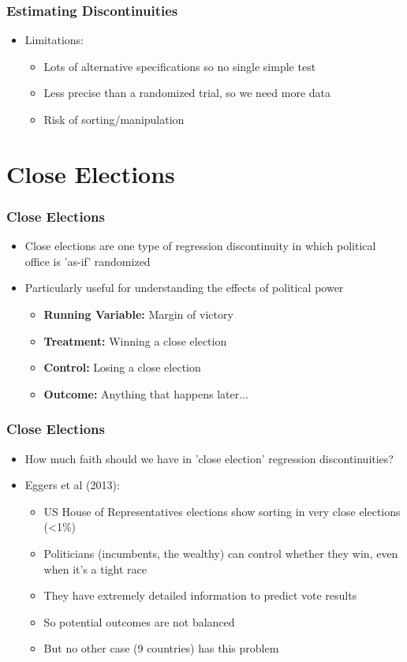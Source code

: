 \documentclass[xcolor=x11names,compress]{beamer}\usepackage[]{graphicx}\usepackage[]{color}
\renewcommand{\(}{\begin{columns}}
\renewcommand{\)}{\end{columns}}
\newcommand{\<}[1]{\begin{column}{#1}}
\renewcommand{\>}{\end{column}}
\begin{document}
\begin{frame}
\frametitle{Estimating Discontinuities}
\begin{itemize}
\item Limitations:
\begin{itemize}
\item Lots of alternative specifications so no single simple test
\pause
\item Less precise than a randomized trial, so we need more data
\pause
\item Risk of sorting/manipulation
\end{itemize}
\end{itemize}
\end{frame}

\section{Close Elections}

\begin{frame}
\frametitle{Close Elections}
\begin{itemize}
\item Close elections are one type of regression discontinuity in which political office is 'as-if' randomized
\pause
\item Particularly useful for understanding the effects of political power
\pause
\begin{itemize}
\item \textbf{Running Variable: }Margin of victory
\item \textbf{Treatment: }Winning a close election
\item \textbf{Control: }Losing a close election
\item \textbf{Outcome: }Anything that happens later...
\end{itemize}
\end{itemize}
\end{frame}

\begin{frame}
\frametitle{Close Elections}
\begin{itemize}
\item How much faith should we have in 'close election' regression discontinuities?
\pause
\item Eggers et al (2013):
\pause
\begin{itemize}
\item US House of Representatives elections show sorting in very close elections (<1\%)
\pause
\item Politicians (incumbents, the wealthy) can control whether they win, even when it's a tight race
\pause
\item They have extremely detailed information to predict vote results
\pause
\item So potential outcomes are not balanced
\pause
\item But no other case (9 countries) has this problem
\end{itemize}
\end{itemize}
\end{frame}
\end{document}
